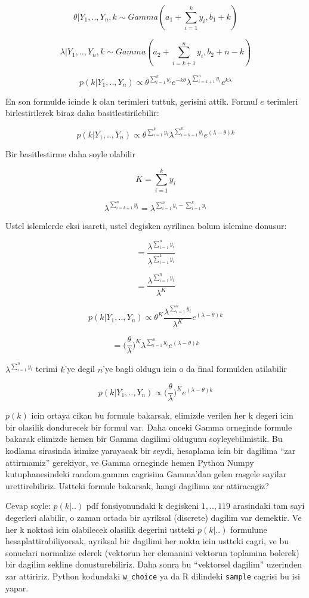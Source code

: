 \documentclass[12pt,fleqn]{article}
\begin{document}
\[ \theta | Y_1,..,Y_n,k \sim Gamma(a_1 + \sum_{i=1}^{k} y_i, b_1+k) \]

\[ \lambda | Y_1,..,Y_n,k \sim Gamma(a_2 + \sum_{i=k+1}^{n} y_i, b_2+n-k) \]

\[ 
p(k | Y_1,..,Y_n) \propto \theta^{\sum_{i=1}^{k} y_i}e^{-k\theta} 
\lambda^{\sum_{i=k+1}^n y_i}e^{k\lambda} 
 \]

En son formulde icinde k olan terimleri tuttuk, gerisini attik. Formul $e$
terimleri birlestirilerek biraz daha basitlestirilebilir:

\[ p(k | Y_1,..,Y_n) \propto
\theta^{\sum_{i=1}^{k} y_i} \lambda^{\sum_{i=k+1}^n y_i}e^{(\lambda-\theta)k} 
 \]

Bir basitlestirme daha soyle olabilir

\[ K = \sum_{i=1}^{k} y_i  \]

\[ \lambda^{\sum_{i=k+1}^n y_i} = \lambda^{\sum_{i=1}^n y_i - \sum_{i=1}^k y_i} \]

Ustel islemlerde eksi isareti, ustel degisken ayrilinca bolum islemine donusur:

\[ = \frac{\lambda^{\sum_{i=1}^n y_i}}{\lambda ^{\sum_{i=1}^k y_i}} \]

\[ = \frac{\lambda^{\sum_{i=1}^n y_i}}{\lambda ^{K}} \]

\[ p(k | Y_1,..,Y_n) \propto 
\theta^{K} \frac{\lambda^{\sum_{i=1}^n y_i}}{\lambda ^{K}} e^{(\lambda-\theta)k} 
 \]

\[ = \bigg(\frac{\theta}{\lambda}\bigg)^{K} \lambda^{\sum_{i=1}^n  y_i} e^{(\lambda-\theta)k} \]

$\lambda^{\sum_{i=1}^n y_i}$ terimi $k$'ye degil $n$'ye bagli oldugu
icin o da final formulden atilabilir

\[ 
p(k | Y_1,..,Y_n) \propto \bigg(\frac{\theta}{\lambda}\bigg)^{K} 
e^{(\lambda-\theta)k}  
\]

$p(k)$ icin ortaya cikan bu formule bakarsak, elimizde verilen her k
degeri icin bir olasilik dondurecek bir formul var. Daha onceki Gamma
orneginde formule bakarak elimizde hemen bir Gamma dagilimi oldugunu
soyleyebilmistik. Bu kodlama sirasinda isimize yarayacak bir seydi,
hesaplama icin bir dagilima ``zar attirmamiz'' gerekiyor, ve Gamma
orneginde hemen Python Numpy kutuphanesindeki random.gamma cagrisina
Gamma'dan gelen rasgele sayilar urettirebiliriz. Ustteki formule
bakarsak, hangi dagilima zar attiracagiz?

Cevap soyle: $p(k|..)$ pdf fonsiyonundaki k degiskeni $1,..,119$ arasindaki
tam sayi degerleri alabilir, o zaman ortada bir ayriksal (discrete) dagilim
var demektir. Ve her k noktasi icin olabilecek olasilik degerini ustteki
$p(k|..)$ formulune hesaplattirabiliyorsak, ayriksal bir dagilimi her nokta
icin ustteki cagri, ve bu sonuclari normalize ederek (vektorun her
elemanini vektorun toplamina bolerek) bir dagilim sekline
donusturebiliriz. Daha sonra bu ``vektorsel dagilim'' uzerinden zar
attiririz. Python kodundaki \verb!w_choice! ya da R dilindeki \verb!sample!
cagrisi bu isi yapar.
\end{document}
